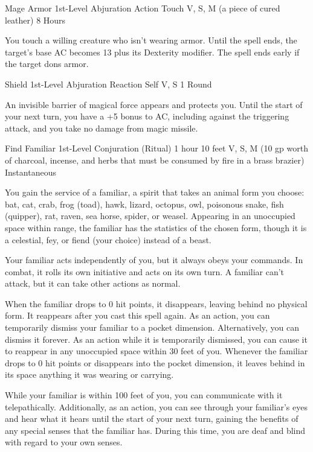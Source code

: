 \documentclass[letterpaper,openany,oneside,twocolumn]{book}
\begin{document}
\DndSpellHeader
  {Mage Armor}
  {1st-Level Abjuration}
  {Action}
  {Touch}
  {V, S, M (a piece of cured leather)}
  {8 Hours}

You touch a willing creature who isn't wearing armor. Until the spell ends, the target's base AC becomes 13 plus its Dexterity modifier. The spell ends early if the target dons armor.

\DndSpellHeader
  {Shield}
  {1st-Level Abjuration}
  {Reaction}
  {Self}
  {V, S}
  {1 Round}

An invisible barrier of magical force appears and protects you. Until the start of your next turn, you have a +5 bonus to AC, including against the triggering attack, and you take no damage from magic missile.

\DndSpellHeader
  {Find Familiar}
  {1st-Level Conjuration (Ritual) }
  {1 hour}
  {10 feet}
  {V, S, M (10 gp worth of charcoal, incense, and herbs that must be consumed by fire in a brass brazier)}
  {Instantaneous}

You gain the service of a familiar, a spirit that takes an animal form you choose: bat, cat, crab, frog (toad), hawk, lizard, octopus, owl, poisonous snake, fish (quipper), rat, raven, sea horse, spider, or weasel. Appearing in an unoccupied space within range, the familiar has the statistics of the chosen form, though it is a celestial, fey, or fiend (your choice) instead of a beast.

Your familiar acts independently of you, but it always obeys your commands. In combat, it rolls its own initiative and acts on its own turn. A familiar can’t attack, but it can take other actions as normal.

When the familiar drops to 0 hit points, it disappears, leaving behind no physical form. It reappears after you cast this spell again. As an action, you can temporarily dismiss your familiar to a pocket dimension. Alternatively, you can dismiss it forever. As an action while it is temporarily dismissed, you can cause it to reappear in any unoccupied space within 30 feet of you. Whenever the familiar drops to 0 hit points or disappears into the pocket dimension, it leaves behind in its space anything it was wearing or carrying.

While your familiar is within 100 feet of you, you can communicate with it telepathically. Additionally, as an action, you can see through your familiar’s eyes and hear what it hears until the start of your next turn, gaining the benefits of any special senses that the familiar has. During this time, you are deaf and blind with regard to your own senses.
\end{document}
